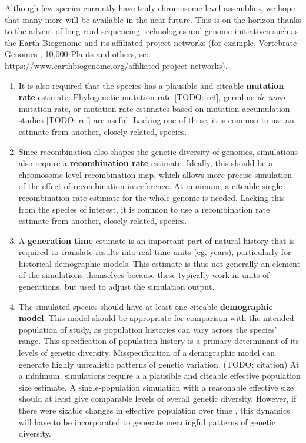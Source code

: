 \documentclass[hidelinks]{article}
\begin{document}
Although few species currently have truly chromosome-level assemblies,
we hope that many more will be available in the near future.
This is on the horizon thanks to the advent of long-read sequencing technologies
\citep{Amarasinghe2020} and genome initiatives such as the Earth Biogenome
\citep{Lewin2022} and its affiliated project networks (for example,
Vertebrate Genomes \citep{Rhie2021}, 10,000 Plants \citep{Cheng2018} and others,
see https://www.earthbiogenome.org/affiliated-project-networks).

\begin{enumerate}
\def\labelenumi{\arabic{enumi}.}
\setcounter{enumi}{1}
\item
  It is also required that the species has a plausible and citeable
  \textbf{mutation rate} estimate. Phylogenetic mutation rate {[}TODO:
  ref{]}, germline \emph{de-novo} mutation rate, or mutation rate
  estimates based on mutation accumulation studies {[}TODO: ref{]} are
  useful. Lacking one of these, it is common to use an estimate from
  another, closely related, species.
\item
  Since recombination also shapes the genetic diversity of genomes,
  simulations also require a \textbf{recombination rate} estimate.
  Ideally, this should be a chromosome level recombination map, which
  allows more precise simulation of the effect of recombination
  interference. At minimum, a citeable single recombination rate
  estimate for the whole genome is needed. Lacking this from the species
  of interest, it is common to use a recombination rate estimate from
  another, closely related, species.
\item
  A \textbf{generation time} estimate is an important part of natural
  history that is required to translate results into real time units
  (eg. years), particularly for historical demographic models. This
  estimate is thus not generally an element of the simulations
  themselves because these typically work in units of generations, but
  used to adjust the simulation output.
\item
  The simulated species should have at least one citeable
  \textbf{demographic model}. This model should be appropriate for
  comparison with the intended population of study, as population
  histories can vary across the species' range. This specification of
  population history is a primary determinant of its levels of genetic
  diversity. Misspecification of a demographic model can generate highly
  unrealistic patterns of genetic variation. (TODO: citation) At a
  minimum, simulations require a a plausible and citeable effective
  population size estimate. A single-population simulation with a
  reasonable effective size should at least give comparable levels of
  overall genetic diversity. However, if there were sizable changes in
  effective population over time \citep[][e.g.,]{MacLeod2013}, this dynamics
  will have to be incorporated to generate meaningful patterns of
  genetic diversity.
\end{enumerate}
\end{document}
